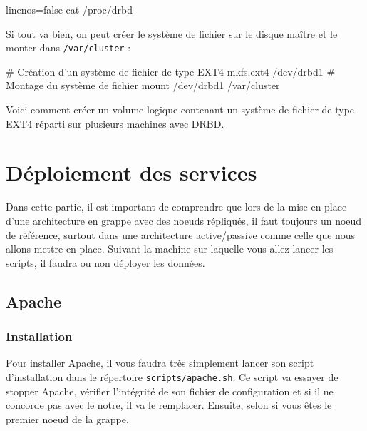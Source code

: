 \documentclass[11pt,a4paper]{report}
\begin{document}
                \begin{bashcode*}{linenos=false}
                    cat /proc/drbd
                \end{bashcode*}
                
                Si tout va bien, on peut créer le système de fichier sur le disque maître et le monter dans \verb+/var/cluster+ :\\
                
                \begin{bashcode}
                    # Création d'un système de fichier de type EXT4
                    mkfs.ext4 /dev/drbd1
                    # Montage du système de fichier
                    mount /dev/drbd1 /var/cluster
                \end{bashcode}
                
                Voici comment créer un volume logique contenant un système de fichier de type EXT4 réparti sur plusieurs machines avec DRBD.
                
        \section{Déploiement des services}
            
            Dans cette partie, il est important de comprendre que lors de la mise en place d'une architecture en grappe avec des noeuds répliqués, il faut toujours un noeud de référence, surtout dans une architecture active/passive comme celle que nous allons mettre en place.
            Suivant la machine sur laquelle vous allez lancer les scripts, il faudra ou non déployer les données.
            
            \subsection{Apache}
                
                \subsubsection{Installation}
                    
                    Pour installer Apache, il vous faudra très simplement lancer son script d'installation dans le répertoire \verb+scripts/apache.sh+.
                    Ce script va essayer de stopper Apache, vérifier l'intégrité de son fichier de configuration et si il ne concorde pas avec le notre, il va le remplacer. Ensuite, selon si vous êtes le premier noeud de la grappe.
                    
\end{document}
